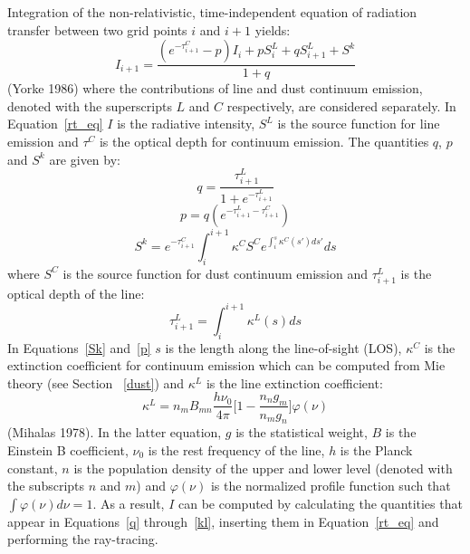 \documentclass{mn2e}
\begin{document}
Integration of the non-relativistic, time-independent equation of radiation transfer between two grid points $\textit{i}$ and $\textit{i}+1$ yields:
\begin{equation}\label{rt_eq}
I_{i+1}=\frac{(e^{-\tau_{i+1}^C}-p)I_i+pS_i^L+qS_{i+1}^L+S^k}{1+q}
\end{equation}  
(Yorke 1986) where the contributions of line and dust continuum emission, denoted with the superscripts $\textit{L}$ and $\textit{C}$ respectively, are considered separately. In Equation~\ref{rt_eq} $I$ is the radiative intensity, $S^L$ is the source function for line emission and $\tau^C$ is the optical depth for continuum emission. The quantities $q$, $p$ and $S^k$ are given by:
\begin{equation}\label{q}
q=\frac{\tau_{i+1}^L}{1+e^{-\tau_{i+1}^L}}
\end{equation}  
\begin{equation}\label{p}
p=q(e^{-\tau_{i+1}^L-\tau_{i+1}^C})
\end{equation}  
\begin{equation}\label{Sk}
S^k=e^{-\tau_{i+1}^C}\int_i^{i+1}\kappa^CS^Ce^{\int_i^s\kappa^C(s')ds'}ds
\end{equation}
where $S^C$ is the source function for dust continuum emission and $\tau_{i+1}^L$ is the optical depth of the line:
\begin{equation}\label{p}
\tau_{i+1}^L=\int_i^{i+1}\kappa^L(s)ds
\end{equation}  
In Equations~\ref{Sk} and~\ref{p} $s$ is the length along the line-of-sight (LOS), $\kappa^C$ is the extinction coefficient for continuum emission which can be computed from Mie theory (see Section ~\ref{dust}) and $\kappa^L$  is the line extinction coefficient:
\begin{equation}\label{kl} 
\kappa^L=n_mB_{mn}\frac{h\nu_0}{4\pi}\big[1-\frac{n_ng_m}{n_mg_n}\big]\varphi(\nu)
\end{equation}  
(Mihalas 1978). In the latter equation, $g$ is the statistical weight, $B$ is the Einstein B coefficient, $\nu_0$ is the rest frequency of the line, $h$ is the Planck constant, $n$ is the population density of the upper and lower level (denoted with the subscripts $n$ and $m$) and $\varphi(\nu)$ is the normalized profile function such that $\int \varphi(\nu) d\nu=1$. As a result, $I$ can be computed by calculating the quantities that appear in Equations~\ref{q} through~\ref{kl}, inserting them in Equation~\ref{rt_eq} and performing the ray-tracing.
\end{document}
